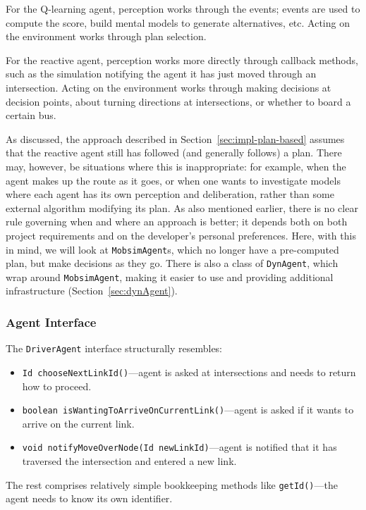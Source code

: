 For the Q-learning agent, perception works through the events; \ie events are used to compute the score, build mental models to generate alternatives, etc. Acting on the environment works through plan selection.

For the reactive agent, perception works more directly through callback methods, such as the simulation notifying the agent it has just moved through an intersection. Acting on the environment works through making decisions at decision points, \eg about turning directions at intersections, or whether to board a certain bus.

As discussed, the approach described in Section~\ref{sec:impl-plan-based} assumes that the reactive agent still has followed (and generally follows) a plan. There may, however, be situations where this is inappropriate: for example, when the agent makes up the route as it goes, or when one wants to investigate models where each agent has its own perception and deliberation, rather than some external algorithm modifying its plan. As also mentioned earlier, there is no clear rule governing when and where an approach is better; it depends both on both project requirements and on the developer's personal preferences.
%
Here, with this in mind, we will look at \lstinline$MobsimAgent$s, which no longer have a pre-computed plan, but make decisions as they go. There is also a class of \lstinline$DynAgent$, which wrap around \lstinline$MobsimAgent$, making it easier to use and providing additional infrastructure (Section~\ref{sec:dynAgent}).

\subsubsection{Agent Interface}
The \lstinline$DriverAgent$ interface structurally resembles:
\begin{itemize}\styleItemize
\item \lstinline$Id chooseNextLinkId()$---agent is asked at intersections and needs to return how to proceed.
\item \lstinline$boolean isWantingToArriveOnCurrentLink()$---agent is asked if it wants to arrive on the current link.
\item \lstinline$void notifyMoveOverNode(Id newLinkId)$---agent is notified that it has traversed the intersection and entered a new link.
\end{itemize}
%
The rest comprises relatively simple bookkeeping methods like \lstinline$getId()$---the agent needs to know its own identifier.

